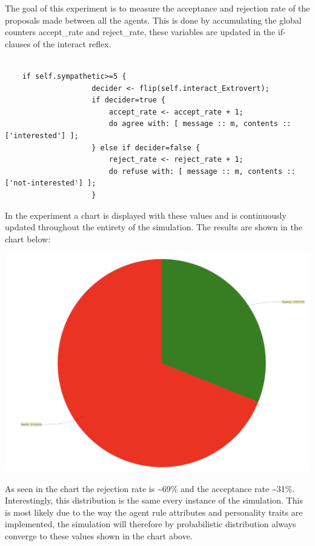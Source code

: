\documentclass[a4paper,10pt]{article}
\begin{document}
The goal of this experiment is to measure the acceptance and rejection rate of the proposals made between all the agents. This is done by accumulating the global counters accept\_rate and reject\_rate, these variables are updated in the if-clauses of the interact reflex. 

\begin{verbatim}

   	if self.sympathetic>=5 {
					decider <- flip(self.interact_Extrovert);
					if decider=true {
						accept_rate <- accept_rate + 1;
						do agree with: [ message :: m, contents :: ['interested'] ];
					} else if decider=false {
						reject_rate <- reject_rate + 1;
						do refuse with: [ message :: m, contents :: ['not-interested'] ];
					}
\end{verbatim}

In the experiment a chart is displayed with these values and is continuously updated throughout the entirety of the simulation. The results are shown in the chart below:

\begin{center}{}
\centering\includegraphics[scale=0.05]{original_exp.png}\par
\end{center}

As seen in the chart the rejection rate is \textasciitilde 69\% and the acceptance rate \textasciitilde 31\%. Interestingly, this distribution is the same every instance of the simulation. This is most likely due to the way the agent rule attributes and personality traits are implemented, the simulation will therefore by probabilistic distribution always converge to these values shown in the chart above. 
\end{document}
